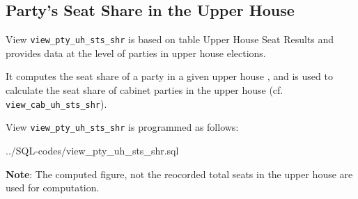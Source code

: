 \subsection{Party's Seat Share in the Upper House}\label{view_pty_uh_sts_shr}
View \texttt{\footnotesize view\_pty\_uh\_sts\_shr} is based on table Upper House Seat Results and provides data at the level of parties in upper house elections.

It computes the seat share of a party in a given upper house , and is used to calculate the seat share of cabinet parties in the upper house (cf.  \texttt{\footnotesize view\_cab\_uh\_sts\_shr}).

View \texttt{\footnotesize view\_pty\_uh\_sts\_shr} is programmed as follows:

%
{../SQL-codes/view_pty_uh_sts_shr.sql}


{\bf Note}: The computed figure, not the reocorded total seats in the upper house are used for computation.


